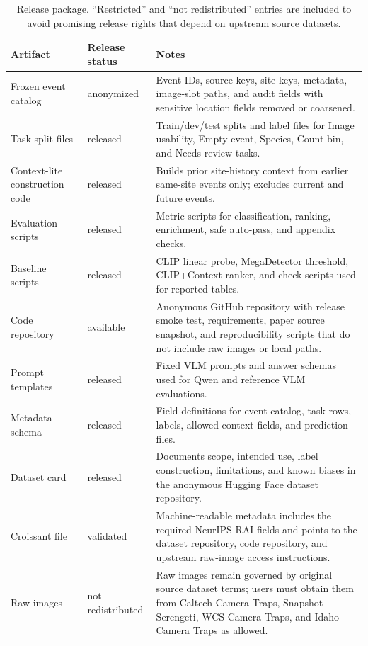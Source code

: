 \documentclass{article}
\begin{document}
\begin{table}[h]
\centering
\caption{Release package. ``Restricted'' and ``not redistributed'' entries are included to avoid promising release rights that depend on upstream source datasets.}
\label{tab:release_package}
\scriptsize
\setlength{\tabcolsep}{3pt}
\begin{tabularx}{\textwidth}{p{3.0cm}p{2.4cm}X}
\toprule
Artifact & Release status & Notes \\
\midrule
Frozen event catalog & anonymized & Event IDs, source keys, site keys, metadata, image-slot paths, and audit fields with sensitive location fields removed or coarsened. \\
Task split files & released & Train/dev/test splits and label files for Image usability, Empty-event, Species, Count-bin, and Needs-review tasks. \\
Context-lite construction code & released & Builds prior site-history context from earlier same-site events only; excludes current and future events. \\
Evaluation scripts & released & Metric scripts for classification, ranking, enrichment, safe auto-pass, and appendix checks. \\
Baseline scripts & released & CLIP linear probe, MegaDetector threshold, CLIP+Context ranker, and check scripts used for reported tables. \\
Code repository & available & Anonymous GitHub repository with release smoke test, requirements, paper source snapshot, and reproducibility scripts that do not include raw images or local paths. \\
Prompt templates & released & Fixed VLM prompts and answer schemas used for Qwen and reference VLM evaluations. \\
Metadata schema & released & Field definitions for event catalog, task rows, labels, allowed context fields, and prediction files. \\
Dataset card & released & Documents scope, intended use, label construction, limitations, and known biases in the anonymous Hugging Face dataset repository. \\
Croissant file & validated & Machine-readable metadata includes the required NeurIPS RAI fields and points to the dataset repository, code repository, and upstream raw-image access instructions. \\
Raw images & not redistributed & Raw images remain governed by original source dataset terms; users must obtain them from Caltech Camera Traps, Snapshot Serengeti, WCS Camera Traps, and Idaho Camera Traps as allowed. \\
\bottomrule
\end{tabularx}
\end{table}
\end{document}
